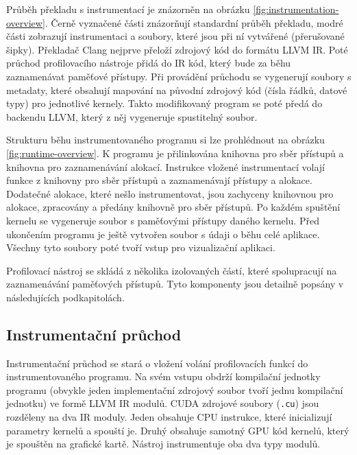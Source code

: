 Průběh překladu s instrumentací je znázorněn na obrázku \ref{fig:instrumentation-overview}. Černě vyznačené části znázorňují standardní průběh překladu, modré části zobrazují instrumentaci a soubory, které jsou při ní vytvářené (přerušované šipky).
Překladač Clang nejprve přeloží zdrojový kód do formátu LLVM IR. Poté průchod profilovacího nástroje přidá do IR kód, který bude za běhu zaznamenávat paměťové přístupy. Při provádění průchodu se vygenerují soubory s metadaty, které obsahují mapování na původní zdrojový kód (čísla řádků, datové typy) pro jednotlivé kernely. Takto modifikovaný program se poté předá do backendu LLVM, který z něj vygeneruje spustitelný soubor.

Strukturu běhu instrumentovaného programu si lze prohlédnout na obrázku \ref{fig:runtime-overview}. K programu je přilinkována knihovna pro sběr přístupů a knihovna pro zaznamenávání alokací. Instrukce vložené instrumentací volají funkce z knihovny pro sběr přístupů a zaznamenávají přístupy a alokace. Dodatečné alokace, které nešlo instrumentovat, jsou zachyceny knihovnou pro alokace, zpracovány a předány knihovně pro sběr přístupů.
Po každém spuštění kernelu se vygeneruje soubor s paměťovými přístupy daného kernelu. Před ukončením programu je ještě vytvořen soubor s údaji o běhu celé aplikace. Všechny tyto soubory poté tvoří vstup pro vizualizační aplikaci.



Profilovací nástroj se skládá z několika izolovaných částí, které spolupracují na zaznamenávání paměťových přístupů. Tyto komponenty jsou detailně popsány v následujících podkapitolách.

\subsection{Instrumentační průchod}
\label{sec:pass}
Instrumentační průchod se stará o vložení volání profilovacích funkcí do instrumentovaného programu. Na svém vstupu obdrží kompilační jednotky programu (obvykle jeden implementační zdrojový soubor tvoří jednu kompilační jednotku) ve formě LLVM IR modulů. CUDA zdrojové soubory (\texttt{.cu}) jsou rozděleny na dva IR moduly. Jeden obsahuje CPU instrukce, které inicializují parametry kernelů a spouští je. Druhý obsahuje samotný GPU kód kernelů, který je spouštěn na grafické kartě. Nástroj instrumentuje oba dva typy modulů.


